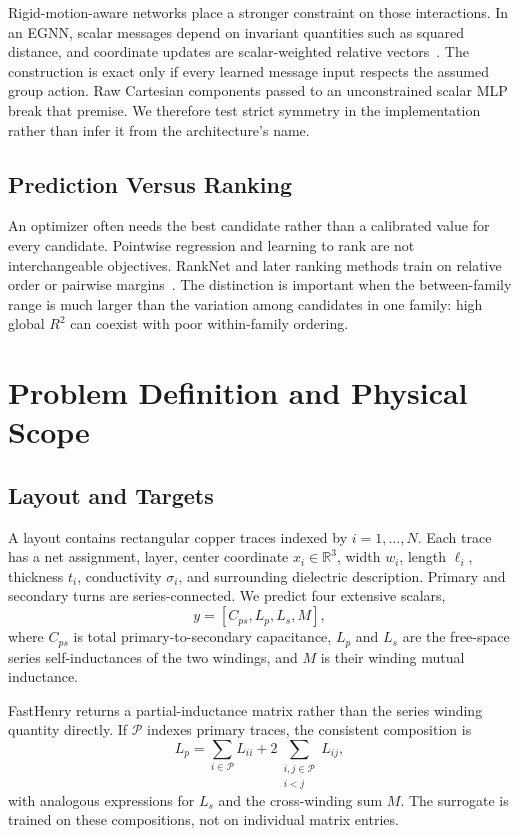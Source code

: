 \documentclass[letterpaper,twocolumn,9pt]{extarticle}
\newcommand{\Cps}{C_{ps}}
\newcommand{\Lp}{L_p}
\newcommand{\Ls}{L_s}
\newcommand{\Mut}{M}
\begin{document}
Rigid-motion-aware networks place a stronger constraint on those interactions. In an EGNN, scalar messages depend on invariant quantities such as squared distance, and coordinate updates are scalar-weighted relative vectors~\cite{egnn}. The construction is exact only if every learned message input respects the assumed group action. Raw Cartesian components passed to an unconstrained scalar MLP break that premise. We therefore test strict symmetry in the implementation rather than infer it from the architecture's name.

\subsection{Prediction Versus Ranking}
An optimizer often needs the best candidate rather than a calibrated value for every candidate. Pointwise regression and learning to rank are not interchangeable objectives. RankNet and later ranking methods train on relative order or pairwise margins~\cite{ranknet,lambdamart}. The distinction is important when the between-family range is much larger than the variation among candidates in one family: high global $R^2$ can coexist with poor within-family ordering.

\section{Problem Definition and Physical Scope}
\subsection{Layout and Targets}
A layout contains rectangular copper traces indexed by $i=1,\ldots,N$. Each trace has a net assignment, layer, center coordinate $x_i\in\mathbb{R}^3$, width $w_i$, length $\ell_i$, thickness $t_i$, conductivity $\sigma_i$, and surrounding dielectric description. Primary and secondary turns are series-connected. We predict four extensive scalars,
\begin{equation}
y=\left[\Cps,\Lp,\Ls,\Mut\right],
\end{equation}
where $\Cps$ is total primary-to-secondary capacitance, $\Lp$ and $\Ls$ are the free-space series self-inductances of the two windings, and $\Mut$ is their winding mutual inductance.

FastHenry returns a partial-inductance matrix rather than the series winding quantity directly. If $\mathcal{P}$ indexes primary traces, the consistent composition is
\begin{equation}
\Lp=\sum_{i\in\mathcal{P}}L_{ii}+2\sum_{\substack{i,j\in\mathcal{P}\\i<j}}L_{ij},
\label{eq:seriesL}
\end{equation}
with analogous expressions for $\Ls$ and the cross-winding sum $\Mut$. The surrogate is trained on these compositions, not on individual matrix entries.
\end{document}
